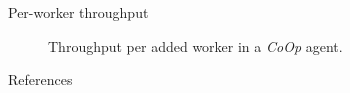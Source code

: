 \documentclass[aspectratio=169,xcolor={dvipsnames}
]{beamer}
\newcommand{\Coopfw}{\emph{CoOp}}
\begin{document}
\begin{frame}{Per-worker throughput}
	\begin{figure}
		\caption{Throughput per added worker in a \Coopfw{} agent.\label{fig:tput-per-core}}
	\end{figure}
\end{frame}

\begin{frame}[allowframebreaks]{References}
	\printbibliography[heading=none]
\end{frame}
\end{document}
